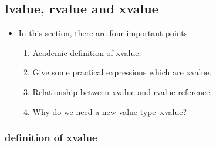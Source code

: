 \documentclass[a4paper,12pt,twoside]{book}
\begin{document}
\subsection{lvalue, rvalue and xvalue}
\begin{itemize}
	\item In this section, there are four important points
	\begin{enumerate}
		\item Academic definition of xvalue.
		\item Give some practical expressions which are xvalue.
		\item Relationship between xvalue and rvalue reference.
		\item Why do we need a new value type--xvalue?
	\end{enumerate}
	
\end{itemize}

\subsubsection{definition of xvalue}
\end{document}
